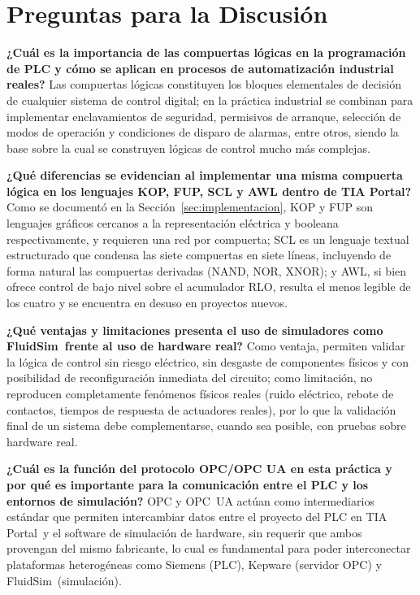 \documentclass[conference]{IEEEtran}
\begin{document}
\section{Preguntas para la Discusión}

\textbf{¿Cuál es la importancia de las compuertas lógicas en la programación de PLC y cómo se aplican en procesos de automatización industrial reales?}
Las compuertas lógicas constituyen los bloques elementales de decisión de cualquier sistema de control digital; en la práctica industrial se combinan para implementar enclavamientos de seguridad, permisivos de arranque, selección de modos de operación y condiciones de disparo de alarmas, entre otros, siendo la base sobre la cual se construyen lógicas de control mucho más complejas.

\textbf{¿Qué diferencias se evidencian al implementar una misma compuerta lógica en los lenguajes KOP, FUP, SCL y AWL dentro de TIA Portal\textregistered?}
Como se documentó en la Sección~\ref{sec:implementacion}, KOP y FUP son lenguajes gráficos cercanos a la representación eléctrica y booleana respectivamente, y requieren una red por compuerta; SCL es un lenguaje textual estructurado que condensa las siete compuertas en siete líneas, incluyendo de forma natural las compuertas derivadas (NAND, NOR, XNOR); y AWL, si bien ofrece control de bajo nivel sobre el acumulador RLO, resulta el menos legible de los cuatro y se encuentra en desuso en proyectos nuevos.

\textbf{¿Qué ventajas y limitaciones presenta el uso de simuladores como FluidSim\textregistered\ frente al uso de hardware real?}
Como ventaja, permiten validar la lógica de control sin riesgo eléctrico, sin desgaste de componentes físicos y con posibilidad de reconfiguración inmediata del circuito; como limitación, no reproducen completamente fenómenos físicos reales (ruido eléctrico, rebote de contactos, tiempos de respuesta de actuadores reales), por lo que la validación final de un sistema debe complementarse, cuando sea posible, con pruebas sobre hardware real.

\textbf{¿Cuál es la función del protocolo OPC/OPC UA en esta práctica y por qué es importante para la comunicación entre el PLC y los entornos de simulación?}
OPC y OPC~UA actúan como intermediarios estándar que permiten intercambiar datos entre el proyecto del PLC en TIA Portal\textregistered\ y el software de simulación de hardware, sin requerir que ambos provengan del mismo fabricante, lo cual es fundamental para poder interconectar plataformas heterogéneas como Siemens (PLC), Kepware (servidor OPC) y FluidSim\textregistered\ (simulación).
\end{document}

